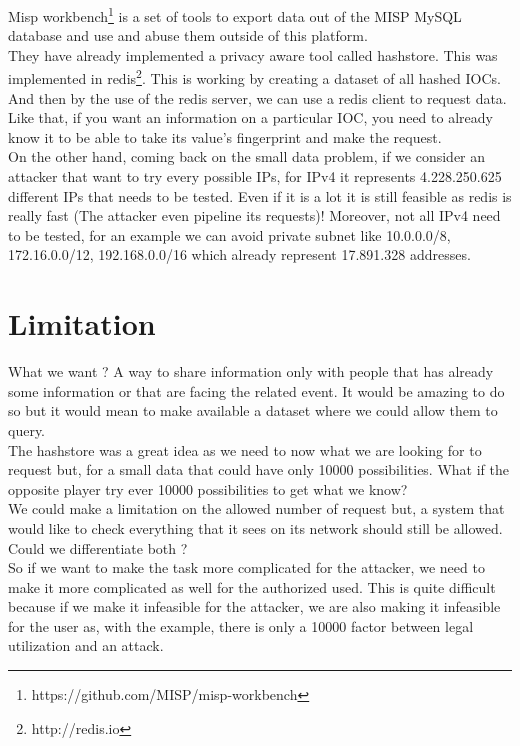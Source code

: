 \documentclass{eplmastersthesis}
\begin{document}
Misp workbench\footnote{https://github.com/MISP/misp-workbench} is a set of tools to export data out of the MISP MySQL database and use and abuse them outside of this platform.\\

They have already implemented a privacy aware tool called hashstore. This was implemented in redis\footnote{http://redis.io}. This is working by creating a dataset of all hashed IOCs. And then by the use of the redis server, we can use a redis client to request data.\\
Like that, if you want an information on a particular IOC, you need to already know it to be able to take its value's fingerprint and make the request.\\
On the other hand, coming back on the small data problem, if we consider an attacker that want to try every possible IPs, for IPv4 it represents 4.228.250.625 different IPs that needs to be tested. Even if it is a lot it is still feasible as redis is really fast (The attacker even pipeline its requests)! Moreover, not all IPv4 need to be tested, for an example we can avoid private subnet like 10.0.0.0/8, 172.16.0.0/12, 192.168.0.0/16 which already represent 17.891.328 addresses.


\section{Limitation}

What we want ? A way to share information only with people that has already some information or that are facing the related event. It would be amazing to do so but it would mean to make available a dataset where we could allow them to query.\\
The hashstore was a great idea as we need to now what we are looking for to request but, for a small data that could have only 10000 possibilities. What if the opposite player try ever 10000 possibilities to get what we know? \\
We could make a limitation on the allowed number of request but, a system that would like to check everything that it sees on its network should still be allowed. Could we differentiate both ? \\
So if we want to make the task more complicated for the attacker, we need to make it more complicated as well for the authorized used. This is quite difficult because if we make it infeasible for the attacker, we are also making it infeasible for the user as, with the example, there is only a 10000 factor between legal utilization and an attack.\\
\end{document}
